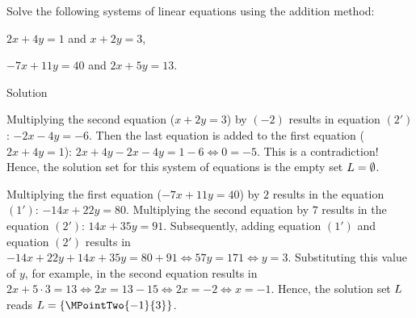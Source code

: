 \begin{MExercises}
\begin{MExercise}
Solve the following systems of linear equations using the addition method:
\begin{MExerciseItems}
\item{$2 x + 4 y = 1$ and $x + 2 y = 3$,}
\item{$- 7 x + 11 y = 40$ and $2 x + 5 y = 13$.}
\end{MExerciseItems}

\begin{MHint}{Solution}
\begin{MExerciseItems}
\item{Multiplying the second equation ($x + 2 y = 3$) by $(- 2)$ results in equation $(2')$:
$- 2 x - 4 y = - 6$. Then the last equation is added to the first equation ($2 x + 4 y = 1$):
$2 x + 4 y - 2 x - 4 y = 1 - 6 \Leftrightarrow 0 = - 5$. This is a contradiction! Hence, the 
solution set for this system of equations is the empty set ${L} = \emptyset$.}
\item{Multiplying the first equation ($- 7 x + 11 y = 40$) by $2$ results in the 
equation $(1')$: $- 14 x + 22 y = 80$. Multiplying the second equation by $7$ results in
the equation $(2')$: $14 x + 35 y = 91$. Subsequently, adding equation $(1')$ and 
equation $(2')$ results in 
$- 14 x + 22 y + 14 x + 35 y = 80 + 91 \Leftrightarrow 57 y = 171 \Leftrightarrow y = 3$.
Substituting this value of $y$, for example, in the second equation results in 
$2 x + 5 \cdot 3 = 13 \Leftrightarrow
2 x = 13 - 15 \Leftrightarrow 2 x = - 2 \Leftrightarrow x = - 1$. Hence, the solution set $L$ 
reads ${\ML} = \{ \MPointTwo{- 1}{ 3} \}$.}
\end{MExerciseItems}
\end{MHint}
\end{MExercise}


\end{MExercises}
